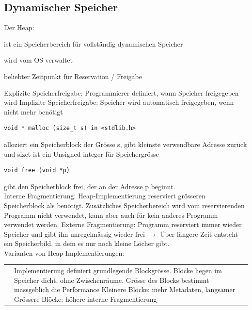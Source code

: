 \documentclass[8pt,landscape,a4paper]{scrartcl}
\newcommand{\drule}[3][0]{%
	\tikz[baseline]{\path[decoration={markings,
			mark=between positions 0 and 1 step 2*#3
			with {\node[fill, circle, minimum width=#3, inner sep=0pt, anchor=south west] {};}},postaction={decorate}]  (0,#1) -- ++(#2,0);}}
\begin{document}
\begin{multicols*}{5}
\section{Dynamischer Speicher}
Der \textcolor{b}{Heap}:
\begin{compactitem} [$\bullet$]
	\item ist ein Speicherbereich für vollständig dynamischen Speicher
	\item wird vom OS verwaltet
	\item beliebter Zeitpunkt für Reservation / Freigabe
\end{compactitem}
\textcolor{b}{Explizite Speicherfreigabe:} Programmierer definiert, wann Speicher freigegeben wird
\textcolor{b}{Implizite Speicherfreigabe:} Speicher wird automatisch freigegeben, wenn nicht mehr benötigt\vspace{-4pt}\\
\drule{5.5cm}{1pt}
\begin{lstlisting}
void * malloc (size_t s) in <stdlib.h>
\end{lstlisting}
alloziert ein Speicherblock der Grösse s, gibt kleinste verwendbare Adresse zurück und size\textunderscore t ist ein Unsigned-integer für Speichergrösse
\begin{lstlisting}
void free (void *p)
\end{lstlisting}
gibt den Speicherblock frei, der an der Adresse p beginnt.\vspace{-4pt}\\
\drule{5.5cm}{1pt}
\textcolor{b}{Interne Fragmentierung:} Heap-Implementierung reserviert grösseren Speicherblock als benötigt. Zusätzliches Speicherbereich wird vom reservierenden Programm nicht verwendet, kann aber auch für kein anderes Programm verwendet werden. 
\textcolor{b}{Externe Fragmentierung:} Programm reserviert immer wieder Speicher und gibt ihn unregelmässig wieder frei $\rightarrow$ Über längere Zeit entsteht ein Speicherbild, in dem es nur noch kleine Löcher gibt.\vspace{-4pt}\\
\drule{5.5cm}{1pt}
\textcolor{b}{Varianten von Heap-Implementierungen:}
\vspace{-12pt}
\begin{center}
	\begin{tabular}{p{.1mm}|p{4.8cm}}
		\parbox[t]{1mm}{} & Implementierung definiert \textcolor{b}{grundlegende Blockgrösse}. Blöcke liegen im Speicher dicht, \textcolor{b}{ohne Zwischenräume}. Grösse des Blocks bestimmt massgeblich die Performance Kleinere Blöcke: mehr Metadaten, langsamer Grössere Blöcke: höhere interne Fragmentierung \\

\end{tabular}
\end{center}
\end{multicols*}
\end{document}
